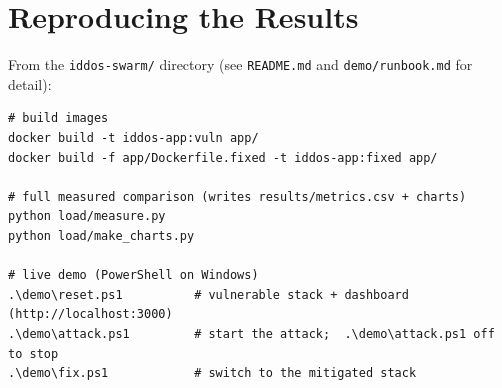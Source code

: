\documentclass[11pt]{article}
\begin{document}
\appendix
\section{Reproducing the Results}

From the \texttt{iddos-swarm/} directory (see \texttt{README.md} and
\texttt{demo/runbook.md} for detail):

\begin{lstlisting}
# build images
docker build -t iddos-app:vuln app/
docker build -f app/Dockerfile.fixed -t iddos-app:fixed app/

# full measured comparison (writes results/metrics.csv + charts)
python load/measure.py
python load/make_charts.py

# live demo (PowerShell on Windows)
.\demo\reset.ps1          # vulnerable stack + dashboard (http://localhost:3000)
.\demo\attack.ps1         # start the attack;  .\demo\attack.ps1 off to stop
.\demo\fix.ps1            # switch to the mitigated stack
\end{lstlisting}
\end{document}
